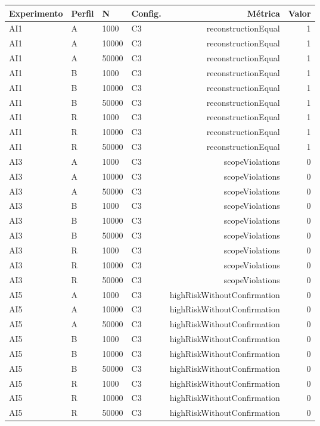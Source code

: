 \begin{longtable}{llllrr}\toprule
Experimento & Perfil & N & Config. & Métrica & Valor \\\midrule
AI1 & A & 1000 & C3 & reconstructionEqual & 1 \\
AI1 & A & 10000 & C3 & reconstructionEqual & 1 \\
AI1 & A & 50000 & C3 & reconstructionEqual & 1 \\
AI1 & B & 1000 & C3 & reconstructionEqual & 1 \\
AI1 & B & 10000 & C3 & reconstructionEqual & 1 \\
AI1 & B & 50000 & C3 & reconstructionEqual & 1 \\
AI1 & R & 1000 & C3 & reconstructionEqual & 1 \\
AI1 & R & 10000 & C3 & reconstructionEqual & 1 \\
AI1 & R & 50000 & C3 & reconstructionEqual & 1 \\
AI3 & A & 1000 & C3 & scopeViolations & 0 \\
AI3 & A & 10000 & C3 & scopeViolations & 0 \\
AI3 & A & 50000 & C3 & scopeViolations & 0 \\
AI3 & B & 1000 & C3 & scopeViolations & 0 \\
AI3 & B & 10000 & C3 & scopeViolations & 0 \\
AI3 & B & 50000 & C3 & scopeViolations & 0 \\
AI3 & R & 1000 & C3 & scopeViolations & 0 \\
AI3 & R & 10000 & C3 & scopeViolations & 0 \\
AI3 & R & 50000 & C3 & scopeViolations & 0 \\
AI5 & A & 1000 & C3 & highRiskWithoutConfirmation & 0 \\
AI5 & A & 10000 & C3 & highRiskWithoutConfirmation & 0 \\
AI5 & A & 50000 & C3 & highRiskWithoutConfirmation & 0 \\
AI5 & B & 1000 & C3 & highRiskWithoutConfirmation & 0 \\
AI5 & B & 10000 & C3 & highRiskWithoutConfirmation & 0 \\
AI5 & B & 50000 & C3 & highRiskWithoutConfirmation & 0 \\
AI5 & R & 1000 & C3 & highRiskWithoutConfirmation & 0 \\
AI5 & R & 10000 & C3 & highRiskWithoutConfirmation & 0 \\
AI5 & R & 50000 & C3 & highRiskWithoutConfirmation & 0 \\

\end{longtable}
